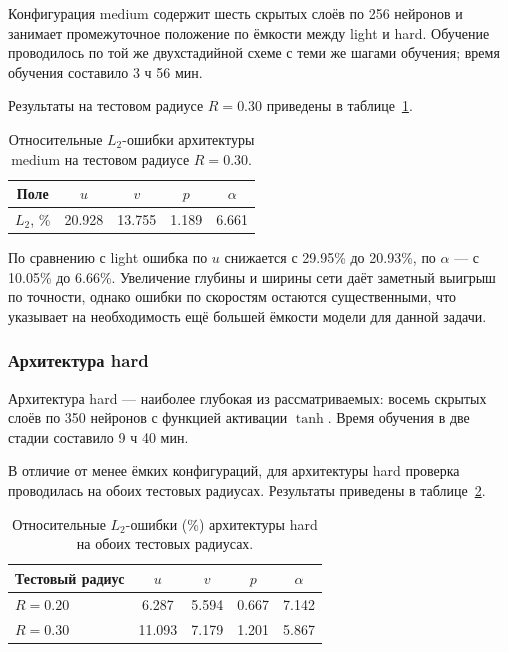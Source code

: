 \documentclass[12pt,a4paper]{article}
\begin{document}
Конфигурация medium содержит шесть скрытых слоёв по 256 нейронов и занимает
промежуточное положение по ёмкости между light и hard. Обучение проводилось
по той же двухстадийной схеме с теми же шагами обучения; время обучения
составило 3 ч 56 мин.

Результаты на тестовом радиусе \(R=0.30\) приведены в
таблице~\ref{tab:medium_errors}.

\begin{table}[H]
    \centering
    \begin{tabular}{c|cccc}
        \hline
        Поле & \(u\) & \(v\) & \(p\) & \(\alpha\) \\
        \hline
        \(L_2\), \% & 20.928 & 13.755 & 1.189 & 6.661 \\
        \hline
    \end{tabular}
    \caption{Относительные \(L_2\)-ошибки архитектуры medium на тестовом радиусе \(R=0.30\).}
    \label{tab:medium_errors}
\end{table}

По сравнению с light ошибка по \(u\) снижается с 29.95\% до 20.93\%, по
\(\alpha\) --- с 10.05\% до 6.66\%. Увеличение глубины и ширины сети даёт
заметный выигрыш по точности, однако ошибки по скоростям остаются
существенными, что указывает на необходимость ещё большей ёмкости модели
для данной задачи.

\subsubsection{Архитектура hard}

Архитектура hard --- наиболее глубокая из рассматриваемых: восемь скрытых
слоёв по 350 нейронов с функцией активации \(\tanh\). Время обучения в две
стадии составило 9 ч 40 мин.

В отличие от менее ёмких конфигураций, для архитектуры hard проверка
проводилась на обоих тестовых радиусах. Результаты приведены в
таблице~\ref{tab:hard_errors}.

\begin{table}[H]
    \centering
    \begin{tabular}{l|cccc}
        \hline
        Тестовый радиус & \(u\) & \(v\) & \(p\) & \(\alpha\) \\
        \hline
        \(R=0.20\) & 6.287 & 5.594 & 0.667 & 7.142 \\
        \(R=0.30\) & 11.093 & 7.179 & 1.201 & 5.867 \\
        \hline
    \end{tabular}
    \caption{Относительные \(L_2\)-ошибки (\%) архитектуры hard на обоих тестовых радиусах.}
    \label{tab:hard_errors}
\end{table}
\end{document}
